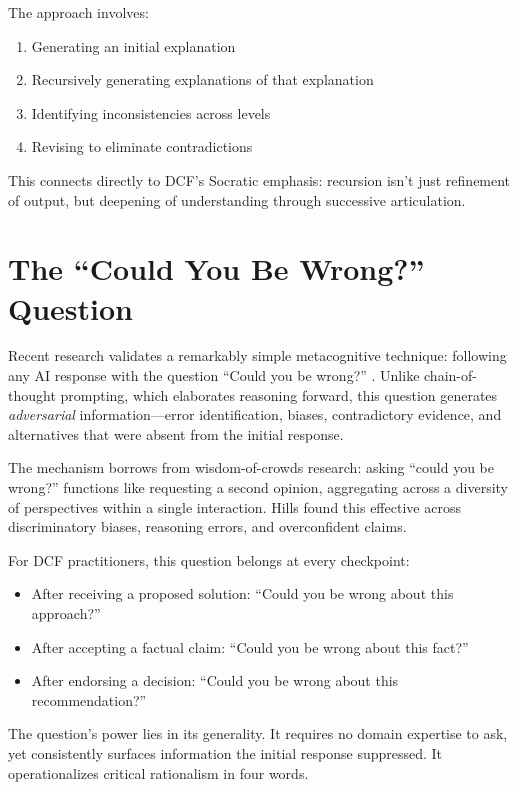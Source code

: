 The approach involves:
\begin{enumerate}
    \item Generating an initial explanation
    \item Recursively generating explanations of that explanation
    \item Identifying inconsistencies across levels
    \item Revising to eliminate contradictions
\end{enumerate}

This connects directly to DCF's Socratic emphasis: recursion isn't just refinement of output, but deepening of understanding through successive articulation.

\section{The ``Could You Be Wrong?'' Question}

Recent research validates a remarkably simple metacognitive technique: following any AI response with the question ``Could you be wrong?'' \cite{hills2025metacognitive}. Unlike chain-of-thought prompting, which elaborates reasoning forward, this question generates \emph{adversarial} information---error identification, biases, contradictory evidence, and alternatives that were absent from the initial response.

The mechanism borrows from wisdom-of-crowds research: asking ``could you be wrong?'' functions like requesting a second opinion, aggregating across a diversity of perspectives within a single interaction. Hills found this effective across discriminatory biases, reasoning errors, and overconfident claims.

For DCF practitioners, this question belongs at every checkpoint:

\begin{itemize}
    \item After receiving a proposed solution: ``Could you be wrong about this approach?''
    \item After accepting a factual claim: ``Could you be wrong about this fact?''
    \item After endorsing a decision: ``Could you be wrong about this recommendation?''
\end{itemize}

The question's power lies in its generality. It requires no domain expertise to ask, yet consistently surfaces information the initial response suppressed. It operationalizes critical rationalism in four words.

